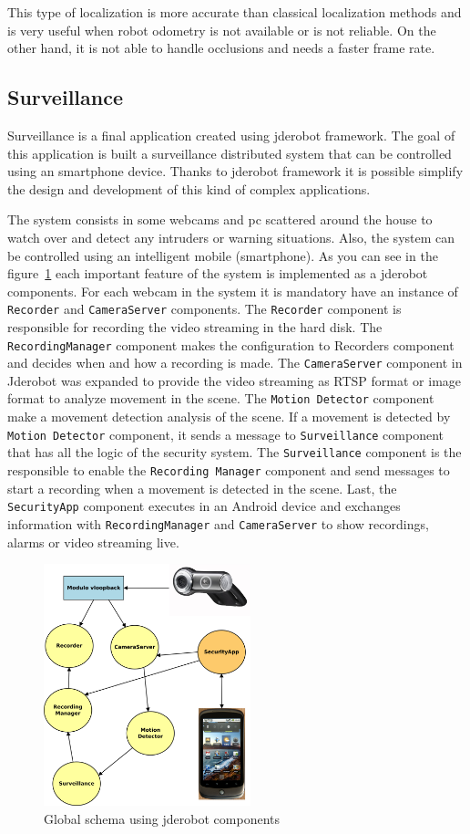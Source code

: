 \documentclass[twocolumn]{svjour3}          %
\begin{document}
This type of localization is more accurate than classical localization methods and is very useful when robot odometry is not available or is not reliable. On the other hand, it is not able to handle occlusions and needs a faster frame rate.

\subsection{Surveillance}

Surveillance is a final application created using jderobot
framework. The goal of this application is built a surveillance
distributed system that can be controlled using an smartphone
device. Thanks to jderobot framework it is possible simplify the design
and development of this kind of complex applications.

The system consists in some webcams and pc scattered around the house
to watch over and detect any intruders or warning situations. Also, the
system can be controlled using an intelligent mobile (smartphone). As
you can see in the figure~\ref{fig:surveillance1} each important
feature of the system is implemented as a jderobot components. For each
webcam in the system it is mandatory have an instance of \texttt{Recorder} and
\texttt{CameraServer} components. The \texttt{Recorder} component is
responsible for recording the video streaming in the hard disk. The
\texttt{RecordingManager} component makes the configuration to
{Recorders} component and decides when and how a recording is
made. The \texttt{CameraServer} component in Jderobot was expanded to provide the video streaming as
RTSP format or image format to analyze movement in the scene. The \texttt{Motion
  Detector} component make a movement detection analysis of the
scene. If a movement is detected by \texttt{Motion Detector} component, it
sends a message to \texttt{Surveillance} component that has all the logic of
the security system. The \texttt{Surveillance} component is the responsible to
enable the \texttt{Recording Manager} component and send messages to
start a recording when a movement is detected in the scene. Last, the
\texttt{SecurityApp} component executes in an Android device and
exchanges information with \texttt{RecordingManager} and
\texttt{CameraServer} to show recordings, alarms or video streaming live.

\begin{figure}
\includegraphics[width=6cm]{figs/surveillance-img1.png}
\caption{Global schema using jderobot components}
\label{fig:surveillance1}
\end{figure}
\end{document}
